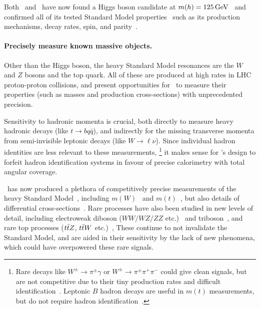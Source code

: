 Both \atlas\ and \cms\ have now found a Higgs boson candidate at
$m(h) = 125\,\eV[G]$~\cite{
atlas2012higgs,
atlas2012combined,
cms2012higgs
}
and confirmed all of its tested Standard Model properties~\cite{
combined2016higgs,
atlas2022ten,
cms2022ten
}
such as its production mechanisms, decay rates,
spin, and parity~\cite{
HIGG-2013-01,
HIGG-2013-17,
HIGG-2014-06
}.

\paragraph{Precisely measure known massive objects.}
Other than the Higgs boson, the heavy Standard Model resonances are the
$W$ and $Z$ bosons and the top quark.
All of these are produced at high rates in LHC proton-proton collisions,
and present opportunities for \atlas\ to measure their properties
(such as masses and production cross-sections) with unprecedented precision.

Sensitivity to hadronic momenta is crucial,
both directly to measure heavy hadronic decays
(like $t \to bq\bar{q}$),
and indirectly for the missing transverse momenta from semi-invisible
leptonic decays (like $W \to \ell\nu$).
Since individual hadron identities are less relevant to these measurements,%
\footnote{%
Rare decays like
$W^\pm \to \pi^\pm \gamma$ or $W^\pm \to \pi^\pm \pi^+ \pi^-$
could give clean signals, but are not competitive due to their
tiny production rates and difficult identification~\cite{
cdf1996search,
mangano2014wpiy,
cms2021wpiy
}.
Leptonic $B$ hadron decays are useful in $m(t)$ measurements, but do not
require hadron identification~\cite{
CDF:2009mbf,
CMS:2016ixg,
ATLAS:2022jbw
}.%
}
it makes sense for \atlas's design to forfeit hadron identification systems
in favour of precise calorimetry with total angular coverage.

\atlas\ has now produced a plethora of competitively precise measurements
of the heavy Standard Model~\cite{atlas2021summarysm},
including $m(W)$~\cite{atlas2018wmass} and
$m(t)$~\cite{atlas2022symmarytop, atlas2019topmass, TOPQ-2015-03},
but also details of differential cross-sections~\cite{
STDM-2016-11,
STDM-2016-14,
TOPQ-2018-15,
TOPQ-2016-10
}.
Rare processes have also been studied in new levels of detail,
including
electroweak diboson ($WW/WZ/ZZ$ etc.)~\cite{
STDM-2015-21,
STDM-2015-23,
STDM-2017-09
}
and triboson~\cite{
STDM-2016-06,
STDM-2017-22,
STDM-2019-09
},
and rare top processes
($\ttbar Z$, $\ttbar W$ etc.)~\cite{
TOPQ-2013-05,
TOPQ-2018-01,
TOPQ-2020-03
},
These continue to not invalidate the Standard Model, and are aided in their
sensitivity by the lack of new phenomena,
which could have overpowered these rare signals.

